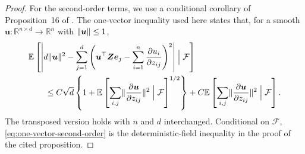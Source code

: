 \documentclass{article}
\theoremstyle{plain}
\theoremstyle{definition}
\theoremstyle{definition}
\DeclarePairedDelimiter\norm{\lVert}{\rVert}
\def\R{{\mathbb{R}}}
\def\E{{\mathbb{E}}}
\def\mathbold{\boldsymbol}
\def\be{\mathbold{e}}
\def\bu{\mathbold{u}}\def\uhat{\widehat{u}}\def\util{\widetilde{u}}\def\ubar{{\overline u}}
\def\bZ{\mathbold{Z}}\def\hbZ{{\widehat{\bZ}}}\def\tbZ{{\widetilde{\bZ}}}
\begin{document}
\begin{proof}
For the second-order terms, we use a conditional corollary of
Proposition~16 of \citet{bellec2022derivatives}. The one-vector inequality
used here states that, for a smooth
$\bu:\R^{n\times d}\to\R^n$ with $\norm{\bu}\leq1$,
\begin{align}
    &\E\left[
       \left|d\norm{\bu}^2-
       \sum_{j=1}^d\left(
          \bu^\top\bZ\be_j-
          \sum_{i=1}^n\pdv{u_i}{z_{ij}}
       \right)^2\right|
       \mathrel{\Big|}\mathcal F
    \right]\notag\\
    &\qquad\leq
       C\sqrt d\left\{1+
       \E\left[
          \sum_{i,j}\norm{\pdv{\bu}{z_{ij}}}^2
          \mathrel{\Big|}\mathcal F
       \right]^{1/2}\right\}
       +C\E\left[
          \sum_{i,j}\norm{\pdv{\bu}{z_{ij}}}^2
          \mathrel{\Big|}\mathcal F
       \right].
    \label{eq:one-vector-second-order}
\end{align}
The transposed version holds with $n$ and $d$ interchanged.  Conditional on
$\mathcal F$, \eqref{eq:one-vector-second-order} is the deterministic-field inequality in the proof of the
cited proposition.


\end{proof}
\end{document}
